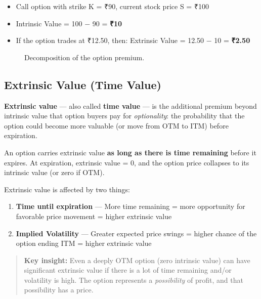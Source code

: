 \documentclass[12pt,openany]{book}
\theoremstyle{definition}
\theoremstyle{remark}
\begin{document}
\begin{itemize}
\item Call option with strike K = ₹90, current stock price S = ₹100


\item Intrinsic Value = 100 \(-\) 90 = \textbf{₹10}


\item If the option trades at ₹12.50, then: Extrinsic Value = 12.50 \(-\) 10 = \textbf{₹2.50}


\end{itemize}
\begin{figure}[H]
\centering
{}
\caption{Decomposition of the option premium.}
\end{figure}
\medskip
\subsection{Extrinsic Value (Time Value)}
\textbf{Extrinsic value} --- also called \textbf{time value} --- is the additional premium beyond intrinsic value that option buyers pay for \emph{optionality}: the probability that the option could become more valuable (or move from OTM to ITM) before expiration.

An option carries extrinsic value \textbf{as long as there is time remaining} before it expires. At expiration, extrinsic value = 0, and the option price collapses to its intrinsic value (or zero if OTM).

Extrinsic value is affected by two things:

\begin{enumerate}
\item \textbf{Time until expiration} --- More time remaining = more opportunity for favorable price movement = higher extrinsic value


\item \textbf{Implied Volatility} --- Greater expected price swings = higher chance of the option ending ITM = higher extrinsic value


\end{enumerate}
\begin{quote}
\textbf{Key insight:} Even a deeply OTM option (zero intrinsic value) can have significant extrinsic value if there is a lot of time remaining and/or volatility is high. The option represents a \emph{possibility} of profit, and that possibility has a price.

\end{quote}
\medskip
\end{document}
